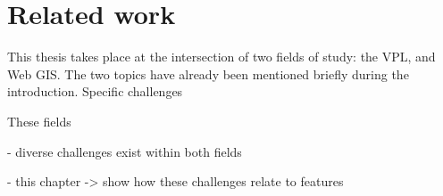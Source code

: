 



\chapter{Related work}

This thesis takes place at the intersection of two fields of study: the VPL, and Web GIS. The two topics have already been mentioned briefly during the introduction. 
Specific challenges 

These fields 

- diverse challenges exist within both fields



- this chapter -> show how these challenges relate to features



